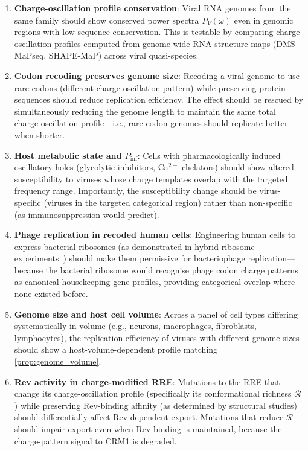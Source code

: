 \documentclass[12pt,a4paper]{article}
\theoremstyle{definition}
\theoremstyle{remark}
\newcommand{\Rcat}{\mathcal{R}}
\begin{document}
\begin{enumerate}[(P1)]
  \item \textbf{Charge-oscillation profile conservation}: Viral RNA genomes from the same family should show conserved power spectra $P_V(\omega)$ even in genomic regions with low sequence conservation. This is testable by comparing charge-oscillation profiles computed from genome-wide RNA structure maps (DMS-MaPseq, SHAPE-MaP) across viral quasi-species.

  \item \textbf{Codon recoding preserves genome size}: Recoding a viral genome to use rare codons (different charge-oscillation pattern) while preserving protein sequences should reduce replication efficiency. The effect should be rescued by simultaneously reducing the genome length to maintain the same total charge-oscillation profile---i.e., rare-codon genomes should replicate better when shorter.

  \item \textbf{Host metabolic state and $P_{\mathrm{inf}}$}: Cells with pharmacologically induced oscillatory holes (glycolytic inhibitors, Ca$^{2+}$ chelators) should show altered susceptibility to viruses whose charge templates overlap with the targeted frequency range. Importantly, the susceptibility change should be virus-specific (viruses in the targeted categorical region) rather than non-specific (as immunosuppression would predict).

  \item \textbf{Phage replication in recoded human cells}: Engineering human cells to express bacterial ribosomes (as demonstrated in hybrid ribosome experiments~\cite{Schmied2014}) should make them permissive for bacteriophage replication---because the bacterial ribosome would recognise phage codon charge patterns as canonical housekeeping-gene profiles, providing categorical overlap where none existed before.

  \item \textbf{Genome size and host cell volume}: Across a panel of cell types differing systematically in volume (e.g., neurons, macrophages, fibroblasts, lymphocytes), the replication efficiency of viruses with different genome sizes should show a host-volume-dependent profile matching \cref{prop:genome_volume}.

  \item \textbf{Rev activity in charge-modified RRE}: Mutations to the RRE that change its charge-oscillation profile (specifically its conformational richness $\Rcat$) while preserving Rev-binding affinity (as determined by structural studies) should differentially affect Rev-dependent export. Mutations that reduce $\Rcat$ should impair export even when Rev binding is maintained, because the charge-pattern signal to CRM1 is degraded.
\end{enumerate}
\end{document}
